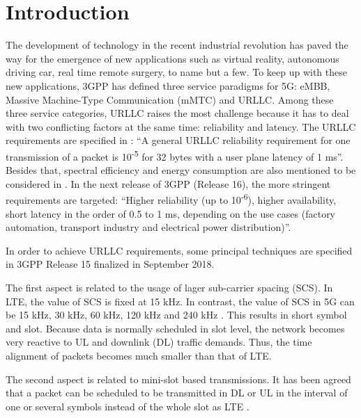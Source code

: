 \documentclass{ieeeaccess}
\begin{document}
\titlepgskip=-15pt

\maketitle

\section{Introduction}
\label{I}
The development of technology in the recent industrial revolution has paved the way for the emergence of new applications such as virtual reality, autonomous driving car, real time remote surgery, to name but a few. To keep up with these new applications, 3GPP has defined three service paradigms for 5G: eMBB, Massive Machine-Type Communication (mMTC) and URLLC. Among these three service categories, URLLC raises the most challenge because it has to deal with two conflicting factors at the same time: reliability and latency. The URLLC requirements are specified in \cite{ref1}: ``A general URLLC reliability requirement for one transmission of a packet is 10\textsuperscript{-5} for 32 bytes with a user plane latency of 1 ms''. Besides that, spectral efficiency and energy consumption are also mentioned to be considered in \cite{ref1}. In the next release of 3GPP (Release 16), the more stringent requirements are targeted: ``Higher reliability (up to 10\textsuperscript{-6}), higher availability, short latency in the order of 0.5 to 1 ms, depending on the use cases (factory automation, transport industry and electrical power distribution)''\cite{ref2}.

In order to achieve URLLC requirements, some principal techniques are specified in 3GPP Release 15 finalized in September 2018.

The first aspect is related to the usage of lager sub-carrier spacing (SCS). In LTE, the value of SCS is fixed at 15 kHz. In contrast, the value of SCS in 5G can be 15 kHz, 30 kHz, 60 kHz, 120 kHz and 240 kHz \cite{ref3}. This results in short symbol and slot. Because data is normally scheduled in slot level, the network becomes very reactive to UL and downlink (DL) traffic demands. Thus, the time alignment of packets becomes much smaller than that of LTE. 

The second aspect is related to mini-slot based transmissions. It has been agreed that a packet can be scheduled to be transmitted in DL or UL in the interval of one or several symbols instead of the whole slot as LTE \cite{ref4}.
\end{document}
